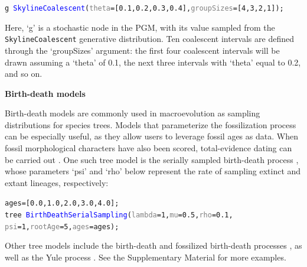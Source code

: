 \documentclass[10pt,letterpaper,table]{article}
\theoremstyle{definition}
\begin{document}
{\small
  \begin{alltt}
    \textcolor{bluishgreen}{g} ~ \textcolor{blue}{SkylineCoalescent}(\textcolor{gray}{theta}=[\textcolor{constant}{0.1}, \textcolor{constant}{0.2}, \textcolor{constant}{0.3}, \textcolor{constant}{0.4}], \textcolor{gray}{groupSizes}=[\textcolor{constant}{4},\textcolor{constant}{3},\textcolor{constant}{2},\textcolor{constant}{1}]);
  \end{alltt}
}

Here, `g' is a stochastic node in the PGM, with its value sampled from the \texttt{SkylineCoalescent} generative distribution. Ten coalescent intervals are defined through the `groupSizes' argument: the first four coalescent intervals will be drawn assuming a `theta' of 0.1, the next three intervals with `theta' equal to 0.2, and so on.
\newline

\noindent \textbf{Birth-death models}

Birth-death models are commonly used in macroevolution as sampling distributions for species trees. 
Models that parameterize the fossilization process can be especially useful, as they allow users to leverage fossil ages as data. 
When fossil morphological characters have also been scored, total-evidence dating can be carried out \cite{ogilvie21}. 
One such tree model is the serially sampled birth-death process \cite{stadler2013dating}, whose parameters `psi' and `rho' below represent the rate of sampling extinct and extant lineages, respectively:

{\small
  \begin{alltt}
    ages = [\textcolor{constant}{0.0}, \textcolor{constant}{1.0}, \textcolor{constant}{2.0}, \textcolor{constant}{3.0}, \textcolor{constant}{4.0}];
    \textcolor{bluishgreen}{tree} ~ \textcolor{blue}{BirthDeathSerialSampling}(\textcolor{gray}{lambda}=1, \textcolor{gray}{mu}=\textcolor{constant}{0.5}, \textcolor{gray}{rho}=\textcolor{constant}{0.1},
    \textcolor{gray}{psi}=\textcolor{constant}{1}, \textcolor{gray}{rootAge}=\textcolor{constant}{5}, \textcolor{gray}{ages}=ages);
  \end{alltt}
}

Other tree models include the birth-death \cite{kendall1948generalized} and fossilized birth-death processes \cite{heath2014fossilized}, as well as the Yule process \cite{yule1925ii}. See the Supplementary Material for more examples.
\end{document}
